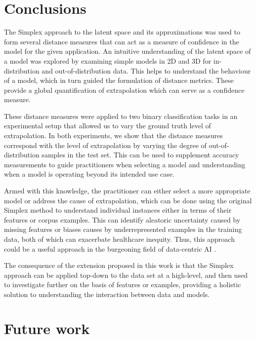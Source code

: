 \documentclass{article}
\begin{document}
\section{Conclusions}

The Simplex approach to the latent space and its approximations was used to form several distance measures that can act as a measure of confidence in the model for the given application.
An intuitive understanding of the latent space of a model was explored by examining simple models in 2D and 3D for in-distribution and out-of-distribution data.
This helps to understand the behaviour of a model, which in turn guided the formulation of distance metrics. These provide a global quantification of extrapolation which can serve as a confidence measure.

These distance measures were applied to two binary classification tasks in an experimental setup that allowed us to vary the ground truth level of extrapolation.
In both experiments, we show that the distance measures correspond with the level of extrapolation by varying the degree of out-of-distribution samples in the test set.
This can be used to supplement accuracy measurements to guide practitioners when selecting a model and understanding when a model is operating beyond its intended use case.

Armed with this knowledge, the practitioner can either select a more appropriate model or address the cause of extrapolation, which can be done using the original Simplex method to understand individual instances either in terms of their features or corpus examples. This can identify aleatoric uncertainty caused by missing features or biases causes by underrepresented examples in the training data, both of which can exacerbate healthcare inequity. Thus, this approach could be a useful approach in the burgeoning field of data-centric AI \cite{zha_data-centric_2023}.

The consequence of the extension proposed in this work is that the Simplex approach can be applied top-down to the data set at a high-level, and then used to investigate further on the basis of features or examples, providing a holistic solution to understanding the interaction between data and models.



\section{Future work}
\label{sec:future work}
\end{document}
